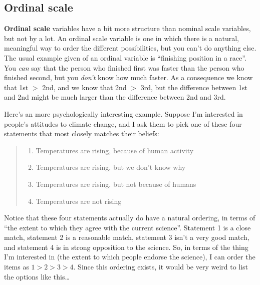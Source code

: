 \documentclass[]{book}
\providecommand{\tightlist}{%
  \setlength{\itemsep}{0pt}\setlength{\parskip}{0pt}}
\begin{document}
\hypertarget{ordinal-scale}{%
\subsection{Ordinal scale}\label{ordinal-scale}}

\textbf{Ordinal scale} variables have a bit more structure than nominal scale variables, but not by a lot. An ordinal scale variable is one in which there is a natural, meaningful way to order the different possibilities, but you can't do anything else. The usual example given of an ordinal variable is ``finishing position in a race''. You {\emph{can}} say that the person who finished first was faster than the person who finished second, but you {\emph{don't}} know how much faster. As a consequence we know that 1st \(>\) 2nd, and we know that 2nd \(>\) 3rd, but the difference between 1st and 2nd might be much larger than the difference between 2nd and 3rd.

Here's an more psychologically interesting example. Suppose I'm interested in people's attitudes to climate change, and I ask them to pick one of these four statements that most closely matches their beliefs:

\begin{quote}
\begin{enumerate}
\def\labelenumi{(\arabic{enumi})}
\tightlist
\item
  Temperatures are rising, because of human activity\\
\item
  Temperatures are rising, but we don't know why\\
\item
  Temperatures are rising, but not because of humans\\
\item
  Temperatures are not rising
\end{enumerate}
\end{quote}

Notice that these four statements actually do have a natural ordering, in terms of ``the extent to which they agree with the current science''. Statement 1 is a close match, statement 2 is a reasonable match, statement 3 isn't a very good match, and statement 4 is in strong opposition to the science. So, in terms of the thing I'm interested in (the extent to which people endorse the science), I can order the items as \(1 > 2 > 3 > 4\). Since this ordering exists, it would be very weird to list the options like this\ldots{}
\end{document}
